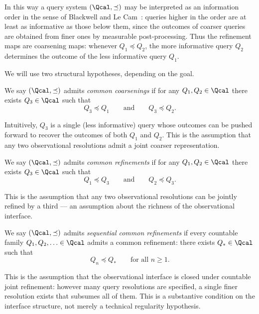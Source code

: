 In this way a query system $(\Qcal,\preceq)$ may be interpreted as an
information order in the sense of Blackwell and Le Cam~\cite{Blackwell,LeCam}:
queries higher in the order are at least as informative as those below
them, since the outcomes of coarser queries are obtained from finer ones
by measurable post-processing.  Thus the refinement maps are coarsening
maps: whenever $Q_1 \preceq Q_2$, the more informative query $Q_2$
determines the outcome of the less informative query $Q_1$.

We will use two structural hypotheses, depending on the goal.

\begin{definition}
\label{def:lower-directed}
We say $(\Qcal,\preceq)$ admits \emph{common coarsenings} if for any $Q_1,Q_2\in\Qcal$
there exists $Q_3\in\Qcal$ such that
\[
Q_3 \preceq Q_1
\qquad\text{and}\qquad
Q_3 \preceq Q_2 .
\]
\end{definition}

Intuitively, $Q_3$ is a single (less informative) query whose outcomes can be
pushed forward to recover the outcomes of both $Q_1$ and $Q_2$. This
is the assumption that any two observational resolutions admit a joint
coarser representation.

\begin{definition}
\label{def:upper-directed}
We say $(\Qcal,\preceq)$ admits \emph{common refinements} if for any $Q_1,Q_2\in\Qcal$
there exists $Q_3\in\Qcal$ such that
\[
Q_1 \preceq Q_3
\qquad\text{and}\qquad
Q_2 \preceq Q_3 .
\]
\end{definition}

This is the assumption that any two observational resolutions can be
jointly refined by a third --- an assumption about the richness of the
observational interface.

\begin{definition}
\label{def:seq-upper-directed}
We say $(\Qcal,\preceq)$ admits \emph{sequential common refinements} if every
countable family $Q_1, Q_2, \ldots \in \Qcal$ admits a common refinement: there exists
$Q_*\in\Qcal$ such that
\[
Q_n \preceq Q_*
\qquad\text{for all } n \ge 1.
\]
\end{definition}

This is the assumption that the observational interface is closed
under countable joint refinement: however many query resolutions are
specified, a single finer resolution exists that subsumes all of them.
This is a substantive condition on the interface structure, not merely
a technical regularity hypothesis.

